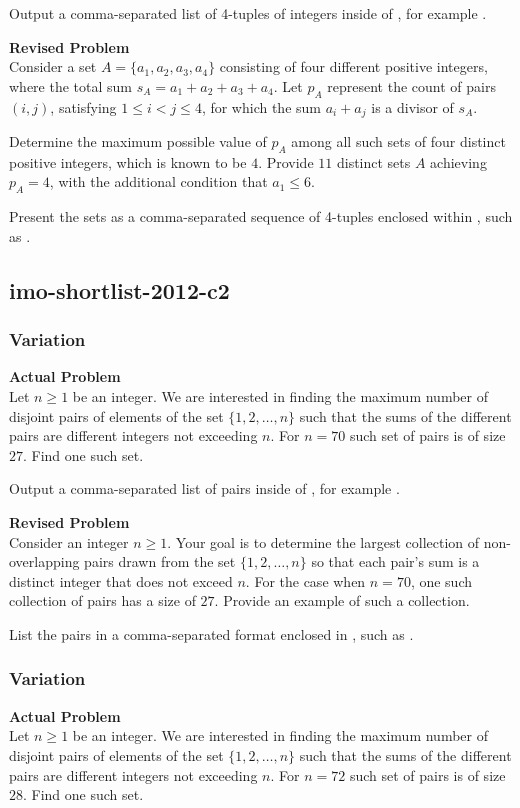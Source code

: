 Output a comma-separated list of 4-tuples of integers inside of \boxed, for example .

\textbf{Revised Problem}\\
Consider a set $A = \{a_1, a_2, a_3, a_4\}$ consisting of four different positive integers, where the total sum $s_A = a_1 + a_2 + a_3 + a_4$. Let $p_A$ represent the count of pairs $(i, j)$, satisfying $1 \leq i < j \leq 4$, for which the sum $a_i + a_j$ is a divisor of $s_A$.

Determine the maximum possible value of $p_A$ among all such sets of four distinct positive integers, which is known to be $4$. Provide $11$ distinct sets $A$ achieving $p_A=4$, with the additional condition that $a_1 \leq 6$.

Present the sets as a comma-separated sequence of 4-tuples enclosed within \boxed, such as .

\subsection{imo-shortlist-2012-c2}
\subsubsection{Variation}
\textbf{Actual Problem}\\
Let $n \geq 1$ be an integer. We are interested in finding the maximum number of disjoint pairs of elements of the
set $\{1, 2, \ldots, n\}$ such that the sums of the different pairs are different integers not exceeding $n$. 
For $n=70$ such set of pairs is of size $27$. Find one such set.

Output a comma-separated list of pairs inside of \boxed, for example .

\textbf{Revised Problem}\\
Consider an integer $n \geq 1$. Your goal is to determine the largest collection of non-overlapping pairs drawn from the set $\{1, 2, \ldots, n\}$ so that each pair's sum is a distinct integer that does not exceed $n$. For the case when $n=70$, one such collection of pairs has a size of $27$. Provide an example of such a collection.

List the pairs in a comma-separated format enclosed in \boxed, such as .

\subsubsection{Variation}
\textbf{Actual Problem}\\
Let $n \geq 1$ be an integer. We are interested in finding the maximum number of disjoint pairs of elements of the
set $\{1, 2, \ldots, n\}$ such that the sums of the different pairs are different integers not exceeding $n$. 
For $n=72$ such set of pairs is of size $28$. Find one such set.

